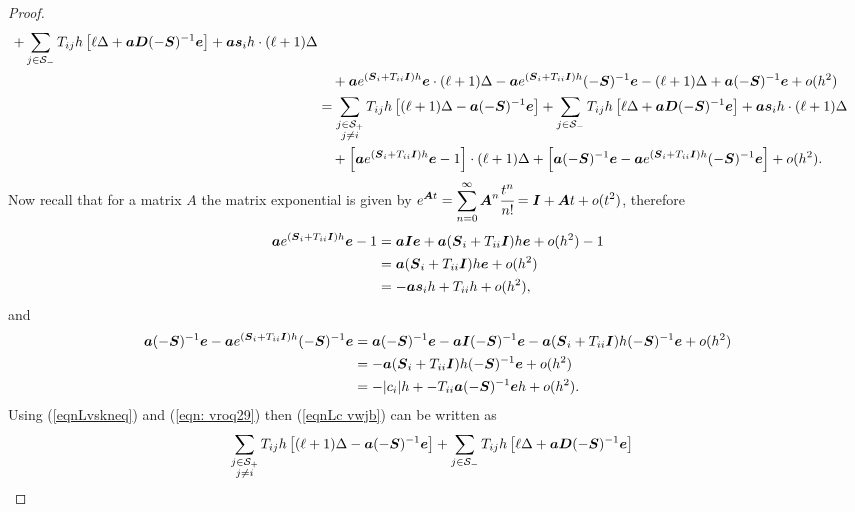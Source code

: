 \begin{proof}
\begin{align}
		+ \sum_{j\in\mathcal S_-}T_{ij}h \left[ \ell\Delta + \boldsymbol a\boldsymbol D(-\boldsymbol S)^{-1}\boldsymbol e \right] \nonumber
		+ \boldsymbol a \boldsymbol s_i h \cdot (\ell+1)\Delta  \nonumber
		\\&\quad {} + \boldsymbol a e^{(\boldsymbol S_i + T_{ii}\boldsymbol I)h}\boldsymbol e \cdot (\ell+1)\Delta - \boldsymbol a e^{(\boldsymbol S_i + T_{ii}\boldsymbol I)h} (-\boldsymbol S)^{-1}\boldsymbol e - (\ell+1)\Delta + \boldsymbol a (-\boldsymbol S)^{-1}\boldsymbol e + o(h^2) \nonumber 
		\\&= \sum_{\substack{j\in\mathcal S_+\\j\neq i}}T_{ij}h \left[ (\ell+1)\Delta - \boldsymbol a (-\boldsymbol S)^{-1}\boldsymbol e \right] \nonumber 
		+ \sum_{j\in\mathcal S_-}T_{ij}h \left[ \ell\Delta + \boldsymbol a\boldsymbol D(-\boldsymbol S)^{-1}\boldsymbol e \right] \nonumber
		+ \boldsymbol a \boldsymbol s_i h \cdot (\ell+1)\Delta  \nonumber
		\\&\quad {} + \left[\boldsymbol a e^{(\boldsymbol S_i + T_{ii}\boldsymbol I)h}\boldsymbol e - 1\right] \cdot (\ell+1)\Delta + \left[\boldsymbol a (-\boldsymbol S)^{-1}\boldsymbol e - \boldsymbol a e^{(\boldsymbol S_i + T_{ii}\boldsymbol I)h} (-\boldsymbol S)^{-1}\boldsymbol e \right] + o(h^2). \label{eqnLc vwjb}
	\end{align}
	Now recall that for a matrix \(A\) the matrix exponential is given by \(\displaystyle e^{\boldsymbol At} = \sum_{n=0}^\infty \boldsymbol A^n\cfrac{t^n}{n!} = \boldsymbol I + \boldsymbol At + o(t^2)\), therefore  
	\begin{align}\boldsymbol a e^{(\boldsymbol S_i + T_{ii}\boldsymbol I)h}\boldsymbol e - 1 &= \boldsymbol a \boldsymbol I \boldsymbol e + \boldsymbol a (\boldsymbol S_i + T_{ii}\boldsymbol I)h \boldsymbol e + o(h^2) - 1 \nonumber 
	\\&= \boldsymbol a (\boldsymbol S_i + T_{ii}\boldsymbol I)h \boldsymbol e + o(h^2) \nonumber
	\\&= -\boldsymbol a \boldsymbol s_ih  + T_{ii}h + o(h^2) ,\label{eqnLvskneq}\end{align}
	and 
	\begin{align}
		\boldsymbol a (-\boldsymbol S)^{-1}\boldsymbol e - \boldsymbol a e^{(\boldsymbol S_i + T_{ii}\boldsymbol I)h} (-\boldsymbol S)^{-1}\boldsymbol e &= \boldsymbol a (-\boldsymbol S)^{-1}\boldsymbol e - \boldsymbol a \boldsymbol I (-\boldsymbol S)^{-1}\boldsymbol e - \boldsymbol a (\boldsymbol S_i + T_{ii}\boldsymbol I)h (-\boldsymbol S)^{-1}\boldsymbol e + o(h^2)\nonumber 
		\\&= - \boldsymbol a (\boldsymbol S_i + T_{ii}\boldsymbol I)h (-\boldsymbol S)^{-1}\boldsymbol e + o(h^2)\nonumber 
		\\&= -|c_i|  h  + -T_{ii}\boldsymbol a(-\boldsymbol S)^{-1}\boldsymbol eh + o(h^2).\label{eqn: vroq29}
	\end{align}
	Using (\ref{eqnLvskneq}) and (\ref{eqn: vroq29}) then (\ref{eqnLc vwjb}) can be written as 
	\begin{align}
		&\sum_{\substack{j\in\mathcal S_+\\j\neq i}}T_{ij}h \left[ (\ell+1)\Delta - \bs a (-\bs S)^{-1}\bs e \right] \nonumber 
		+ \sum_{j\in\mathcal S_-}T_{ij}h \left[ \ell\Delta + \bs a\bs D(-\bs S)^{-1}\bs e \right] \nonumber

\end{align}
\end{proof}
